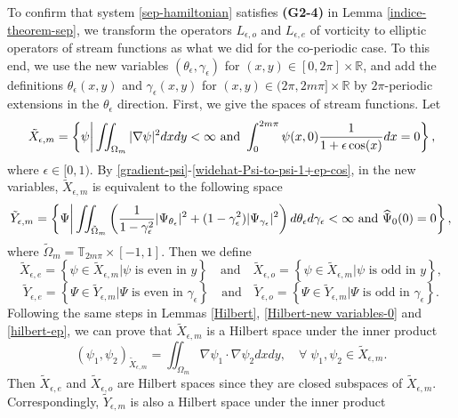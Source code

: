 \documentclass[1 [leqno, 11pt]{amsart}
\numberwithin{equation}{section}
\let\ep=\epsilon
\begin{document}
\begin{CJK*}{GBK}{song}
To confirm that system \eqref{sep-hamiltonian} satisfies {\textbf{(G2-4)}} in Lemma \ref{indice-theorem-sep}, we transform the operators $L_{\ep,o} $
 and  $L_{\ep,e}$ of vorticity to elliptic operators of stream functions as what we did for the co-periodic case.  To this end, we
use the new variables $(\theta_\ep,\gamma_\ep)$ for $(x,y)\in[0,2\pi]\times\mathbb{R}$, and add the definitions $\theta_\ep(x,y)$ and $\gamma_\ep(x,y)$ for $(x,y)\in(2\pi,2m\pi]\times\mathbb{R}$ by $2\pi$-periodic extensions in the $\theta_\ep$ direction.
First, we  give the spaces of stream functions.
Let
\begin{align}\label{space-tilde-Xep-m}
\tilde{X}_{\ep,m} = \left\{\psi \bigg| \iint_{\Omega_m} |\nabla \psi|^2 dxdy <  \infty \text{ and } \int_{0}^{2m\pi}\psi(x,0){1\over1+\epsilon\cos(x)} dx = 0 \right\},
\end{align}
where $\ep\in[0,1)$.
By \eqref{gradient-psi}-\eqref{widehat-Psi-to-psi-1+ep-cos}, in the new variables, $\tilde{X}_{\ep,m}$ is equivalent  to the following space
\begin{align}\label{def-Y-ep-m}
\tilde{Y}_{\ep,m} = \left\{ \Psi \bigg| \iint_{\tilde \Omega_{m}}\left({1\over1-\gamma_\ep^2}|\Psi_{\theta_\ep}|^2+(1-\gamma_\ep^2)|\Psi_{\gamma_\ep}|^2\right)d \theta_\ep d\gamma_\ep< \infty \text{ and } \widehat{\Psi}_0(0)=0 \right\},
\end{align}
 where
  $\tilde{\Omega}_{m} = \mathbb{T}_{2m\pi} \times [-1, 1]$.
Then we  define
$$\tilde{X}_{\ep, e} = \left\{ \psi \in \tilde{X}_{\ep,m} | \psi \text{ is even in }y \right\} \quad \text{and} \quad \tilde{X}_{\ep, o} = \left\{ \psi \in \tilde{X}_{\ep,m} | \psi \text{ is odd in }y \right\},$$
$$\tilde{Y}_{\ep, e} = \left\{ \Psi \in \tilde{Y}_{\ep,m} | \Psi \text{ is even in } \gamma_\ep  \right\} \quad \text{and} \quad \tilde{Y}_{\ep, o} = \left\{ \Psi \in \tilde{Y}_{\ep,m} | \Psi \text{ is odd in }\gamma_\ep \right\}.$$
Following the same steps in Lemmas \ref{Hilbert}, \ref{Hilbert-new variables-0} and \ref{hilbert-ep}, we can prove that $\tilde{X}_{\ep,m}$ is a Hilbert space under the inner product
$$(\psi_1, \psi_2)_{\tilde{X}_{\ep,m}} = \iint_{\Omega_m} \nabla \psi_1 \cdot \nabla \psi_2 dxdy, \quad \forall \;\psi_1, \psi_2 \in \tilde{X}_{\ep,m}.$$
Then $\tilde{X}_{\ep, e}$ and  $\tilde{X}_{\ep, o}$ are Hilbert spaces since they are closed subspaces of $\tilde{X}_{\ep,m}$.
 Correspondingly, $\tilde{Y}_{\ep,m}$ is also a Hilbert space under the inner product

\end{CJK*}
\end{document}
